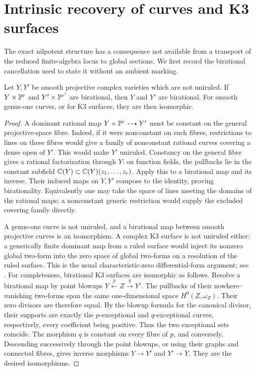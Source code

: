 \section{Intrinsic recovery of curves and K3 surfaces}
\label{sec:intrinsic-recovery}
The exact nilpotent structure has a consequence not available from
a transport of the reduced finite-algebra locus to global sections.
We first record the birational cancellation used to state it without
an ambient marking.

\begin{lemma}
\label{lem:nonuniruled-cancellation}
Let $Y,Y'$ be smooth projective complex varieties which are not
uniruled. If $Y\times\mathbb P^r$ and $Y'\times\mathbb P^{r'}$ are
birational, then $Y$ and $Y'$ are birational. For smooth genus-one
curves, or for K3 surfaces, they are then isomorphic.
\end{lemma}
\begin{proof}
A dominant rational map $Y\times\mathbb P^r\dashrightarrow Y'$ must
be constant on the general projective-space fibre. Indeed, if it
were nonconstant on such fibres, restrictions to lines on these
fibres would give a family of nonconstant rational curves covering
a dense open of $Y'$. This would make $Y'$ uniruled. Constancy on
the general fibre gives a rational factorization through $Y$:
on function fields, the pullbacks lie in the constant subfield
$\mathbb C(Y)\subset\mathbb C(Y)(z_1,\ldots,z_r)$. Apply this to a birational
map and its inverse. Their induced maps on $Y,Y'$ compose to the
identity, proving birationality. Equivalently one may take the
space of lines meeting the domains of the rational maps; a
nonconstant generic restriction would supply the excluded covering
family directly.

A genus-one curve is not uniruled, and a birational map between
smooth projective curves is an isomorphism. A complex K3 surface
is not uniruled either: a generically finite dominant map from a
ruled surface would inject its nonzero global two-form into the
zero space of global two-forms on a resolution of the ruled
surface. This is the usual characteristic-zero differential-form
argument; see \cite[Chapter 9, proof of Corollary 4.4]{HuyK3}.
For completeness, birational K3 surfaces are isomorphic as follows.
Resolve a birational map by point blowups
$Y\xleftarrow{p}Z\xrightarrow{q}Y'$. The pullbacks of their
nowhere-vanishing two-forms span the same one-dimensional space
$H^0(Z,\omega_Z)$. Their zero divisors are therefore equal.
By the blowup formula for the canonical divisor, their supports
are exactly the $p$-exceptional and $q$-exceptional curves,
respectively, every coefficient being positive. Thus the two
exceptional sets coincide. The morphism $q$ is constant on every
fibre of $p$, and conversely. Descending successively through the
point blowups, or using their graphs and connected fibres, gives
inverse morphisms $Y\to Y'$ and $Y'\to Y$. They are the desired
isomorphisms.
\end{proof}

